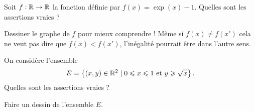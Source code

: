 \begin{question}
Soit $f : \mathbb{R} \to \mathbb{R}$ la fonction définie par $f(x)=\exp(x)-1$.
Quelles sont les assertions vraies ?
\begin{answers}
\end{answers}
\begin{explanations}
Dessiner le graphe de $f$ pour mieux comprendre ! 
Même si $f(x) \neq f(x')$ cela ne veut pas dire que $f(x) < f(x')$, l'inégalité pourrait être dans l'autre sens.
\end{explanations}
\end{question}


\begin{question}
On considère l'ensemble 
$$E = \left\{ (x,y) \in \mathbb{R}^2 \mid 0 \leqslant x \leqslant 1 \text{ et } y \geqslant \sqrt{x}  \right\}.$$
Quelles sont les assertions vraies ?
\begin{answers}
    


\end{answers}
\begin{explanations}
Faire un dessin de l'ensemble $E$.
\end{explanations}
\end{question}



